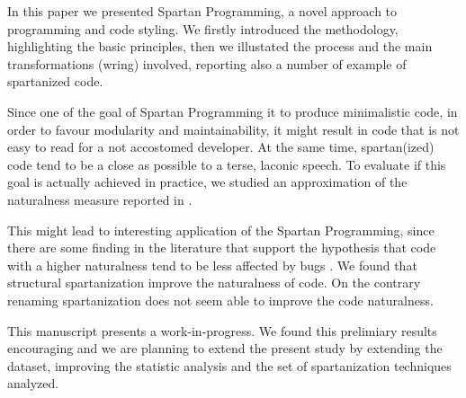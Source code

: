 In this paper we presented Spartan Programming, a novel approach to programming 
and code styling.
We firstly introduced the methodology, highlighting the basic principles, then 
we illustated the process and the main transformations (wring) involved, 
reporting also a number of example of spartanized code.

Since one of the goal of Spartan Programming it to produce minimalistic code, 
in order to favour modularity and maintainability, it might result in 
code that is not easy to read for a not accostomed developer.
At the same time, spartan(ized) code tend to be a close as possible 
to a terse, laconic speech. To evaluate if this goal is actually achieved 
in practice, we studied an approximation of the naturalness measure reported in 
\cite{Hindle:Bar:Su:Gabel:Devanbu:12}. 

This might lead to interesting application of the Spartan Programming, since 
there are some finding in the literature that support the hypothesis that code 
with a higher naturalness tend to be less affected by bugs 
\cite{Hindle:Bar:Su:Gabel:Devanbu:12}.
We found that structural spartanization improve the naturalness of code. 
On the contrary renaming spartanization does not seem able to improve the code naturalness.

This manuscript presents a work-in-progress. 
We found this prelimiary results encouraging and 
we are planning to extend the present study by extending the dataset, improving the 
statistic analysis and the set of spartanization techniques analyzed. 

% 
% 
